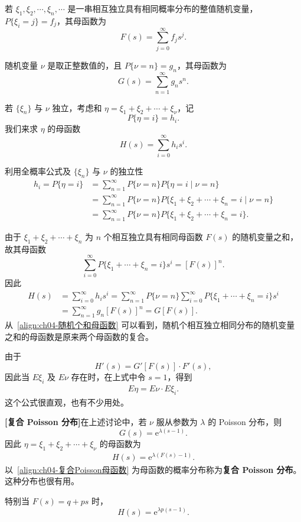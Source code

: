 \documentclass[../../main.tex]{subfiles}
\begin{document}
若 $\xi_1,\xi_2,\cdots,\xi_n,\cdots$ 是一串相互独立具有相同概率分布的整值随机变量，$P\{\xi_i=j\}=f_j$，其母函数为
\[
F(s)=\sum_{j=0}^{\infty}f_j s^j.
\]

随机变量 $\nu$ 是取正整数值的，且 $P\{\nu=n\}=g_n$，其母函数为
\[
G(s)=\sum_{n=1}^{\infty}g_n s^n.
\]

若 $\{\xi_n\}$ 与 $\nu$ 独立，考虑和 $\eta=\xi_1+\xi_2+\cdots+\xi_\nu$，记
\[
P\{\eta=i\}=h_i.
\]
我们来求 $\eta$ 的母函数
\[
H(s)=\sum_{i=0}^{\infty}h_i s^i.
\]

利用全概率公式及 $\{\xi_n\}$ 与 $\nu$ 的独立性
\begin{align*}
h_i=P\{\eta=i\}&=\sum_{n=1}^{\infty}P\{\nu=n\}P\{\eta=i\mid\nu=n\}\\
&=\sum_{n=1}^{\infty}P\{\nu=n\}P\{\xi_1+\xi_2+\cdots+\xi_n=i\mid\nu=n\}\\
&=\sum_{n=1}^{\infty}P\{\nu=n\}P\{\xi_1+\xi_2+\cdots+\xi_n=i\}.
\end{align*}

由于 $\xi_1+\xi_2+\cdots+\xi_n$ 为 $n$ 个相互独立具有相同母函数 $F(s)$ 的随机变量之和，故其母函数
\[
\sum_{i=0}^{\infty}P\{\xi_1+\cdots+\xi_n=i\}s^i=[F(s)]^n.
\]
因此
\begin{align}
H(s)&=\sum_{i=0}^{\infty}h_i s^i=\sum_{n=1}^{\infty}P\{\nu=n\}\sum_{i=0}^{\infty}P\{\xi_1+\cdots+\xi_n=i\}s^i\nonumber\\
&=\sum_{n=1}^{\infty}g_n[F(s)]^n=G[F(s)].\label{align:ch04-随机个和母函数}
\end{align}
从~\eqref{align:ch04-随机个和母函数} 可以看到，随机个相互独立相同分布的随机变量之和的母函数是原来两个母函数的复合。

由于
\[
H'(s)=G'[F(s)]\cdot F'(s),
\]
因此当 $E\xi_i$ 及 $E\nu$ 存在时，在上式中令 $s=1$，得到
\begin{align}
E\eta=E\nu\cdot E\xi_i.\label{align:ch04-随机个和期望}
\end{align}
这个公式很直观，也有不少用处。

\textbf{[复合 Poisson 分布]}\quad 在上述讨论中，若 $\nu$ 服从参数为 $\lambda$ 的 Poisson 分布，则
\[
G(s)=\mathrm{e}^{\lambda(s-1)}.
\]
因此 $\eta=\xi_1+\xi_2+\cdots+\xi_\nu$ 的母函数为
\begin{align}
H(s)=\mathrm{e}^{\lambda(F(s)-1)}.\label{align:ch04-复合Poisson母函数}
\end{align}
以~\eqref{align:ch04-复合Poisson母函数} 为母函数的概率分布称为\textbf{复合 Poisson 分布}。这种分布也很有用。

特别当 $F(s)=q+ps$ 时，
\[
H(s)=\mathrm{e}^{\lambda p(s-1)}.
\]
\end{document}
